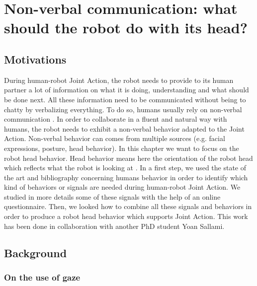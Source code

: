 \documentclass[english,a4paper,11pt,twoside]{StyleThese}
\begin{document}
\setcounter{chapter}{5} %
\dominitoc
\faketableofcontents
\fi

\chapter{Non-verbal communication: what should the robot do with its head?}
\minitoc

\label{ch:Acting}

\section{Motivations}

During human-robot Joint Action, the robot needs to provide to its human partner a lot of information on what it is doing, 
understanding and what should be done next. All these information need to be communicated without being to chatty by verbalizing everything. To do so, humans usually rely on non-verbal communication \cite{ekman1969repertoire, depaulo1992nonverbal}. In order to collaborate in a fluent and natural way with humans, the robot needs to exhibit a non-verbal behavior adapted to the Joint Action. Non-verbal behavior can comes from multiple sources (e.g. facial expressions, posture, head behavior). In this chapter we want to focus on the robot head behavior. Head behavior means here the orientation of the robot head which reflects what the robot is looking at \cite{imai2002robot}. In a first step, we used the state of the art and bibliography concerning humans behavior in order to identify which kind of behaviors or signals are needed during human-robot Joint Action. We studied in more details some of these signals with the help of an online questionnaire. Then, we looked how to combine all these signals and behaviors in order to produce a robot head behavior which supports Joint Action. This work has been done in collaboration with another PhD student Yoan Sallami.


\section{Background}

\subsection{On the use of gaze}
\end{document}
